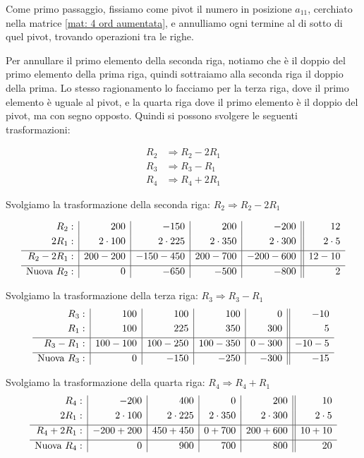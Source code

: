 Come primo passaggio, fissiamo come pivot il numero in posizione $a_{11}$, cerchiato nella matrice \ref{mat: 4 ord aumentata}, e annulliamo ogni termine al di sotto di quel pivot, trovando operazioni tra le righe. 

Per annullare il primo elemento della seconda riga, notiamo che è il doppio del primo elemento della prima riga, quindi sottraiamo alla seconda riga il doppio della prima. Lo stesso ragionamento lo facciamo per la terza riga, dove il primo elemento è uguale al pivot, e la quarta riga dove il primo elemento è il doppio del pivot, ma con segno opposto. Quindi si possono svolgere le seguenti trasformazioni:

\begin{equation}
\begin{aligned}
R_2 &\Rightarrow R_2 - 2R_1 \\
R_3 &\Rightarrow R_3 - R_1 \\
R_4 &\Rightarrow R_4 + 2R_1
\end{aligned}
\end{equation}

Svolgiamo la trasformazione della seconda riga: $R_2 \Rightarrow R_2 - 2R_1$


\[
\begin{array}{r | r | r | r | r || r}
R_2: & 200 & -150 & 200 & -200 & 12 \\[1mm]
2 R_1: & 2 \cdot 100 & 2 \cdot 225 & 2 \cdot 350 & 2 \cdot 300 & 2 \cdot 5 \\[1mm]
\hline
 R_2 - 2R_1: & 200-200 & -150-450 & 200-700 & -200-600 & 12-10 \\[1mm]
\hline
\text{Nuova }R_2: & 0 & -650 & -500 & -800 & 2
\end{array}
\]
\vspace{0.5cm}


Svolgiamo la trasformazione della terza riga: $R_3 \Rightarrow R_3 - R_1$
\[
\begin{array}{r | r | r | r | r || r}
R_3: & 100 & 100 & 100 & 0 & -10 \\[1mm]
R_1: & 100 & 225 & 350 & 300 & 5 \\[1mm]
\hline
R_3 - R_1: & 100-100 & 100-250 & 100-350 & 0-300 & -10-5 \\[1mm]
\hline
\text{Nuova }R_3: & 0 & -150 & -250 & -300 & -15
\end{array}
\]
\vspace{0.5cm}


Svolgiamo la trasformazione della quarta riga: $R_4 \Rightarrow R_4 + R_1$
\[
\begin{array}{r | r | r | r | r || r}
R_4: & -200 & 400 & 0 & 200 & 10 \\[1mm]
2 R_1: & 2 \cdot 100 & 2 \cdot 225 & 2 \cdot 350 & 2 \cdot 300 & 2 \cdot 5 \\[1mm]
\hline
R_4 + 2R_1: & -200+200 & 450+450 & 0+700 & 200+600 & 10+10 \\[1mm]
\hline
\text{Nuova }R_4: & 0 & 900 & 700 & 800 & 20
\end{array}
\]

